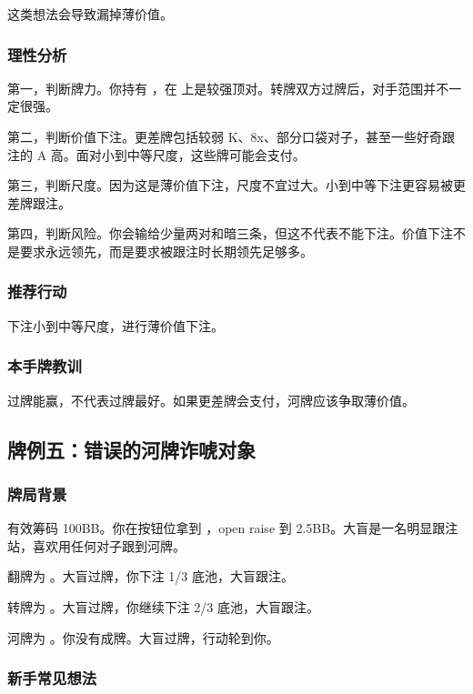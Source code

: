 这类想法会导致漏掉薄价值。

\subsubsection*{理性分析}

第一，判断牌力。你持有 ，在  上是较强顶对。转牌双方过牌后，对手范围并不一定很强。

第二，判断价值下注。更差牌包括较弱 K、8x、部分口袋对子，甚至一些好奇跟注的 A 高。面对小到中等尺度，这些牌可能会支付。

第三，判断尺度。因为这是薄价值下注，尺度不宜过大。小到中等下注更容易被更差牌跟注。

第四，判断风险。你会输给少量两对和暗三条，但这不代表不能下注。价值下注不是要求永远领先，而是要求被跟注时长期领先足够多。

\subsubsection*{推荐行动}

下注小到中等尺度，进行薄价值下注。

\subsubsection*{本手牌教训}

过牌能赢，不代表过牌最好。如果更差牌会支付，河牌应该争取薄价值。

\subsection{牌例五：错误的河牌诈唬对象}

\subsubsection*{牌局背景}

有效筹码 100BB。你在按钮位拿到 ，open raise 到 2.5BB。大盲是一名明显跟注站，喜欢用任何对子跟到河牌。

翻牌为 。大盲过牌，你下注 1/3 底池，大盲跟注。

转牌为 。大盲过牌，你继续下注 2/3 底池，大盲跟注。

河牌为 。你没有成牌。大盲过牌，行动轮到你。

\subsubsection*{新手常见想法}

